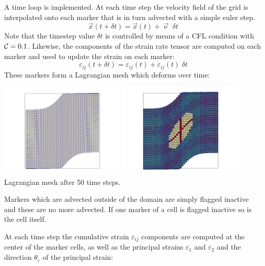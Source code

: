 A time loop is implemented. At each time step the velocity field of the grid is 
interpolated onto each marker that is in turn advected with a simple euler step. 
\[
\vec{x}(t+\delta t) = \vec{x}(t) + \vec\upnu \; \delta t
\]
Note that the timestep value $\delta t$ is controlled by means of a CFL condition 
with ${\cal C}=0.1$. Likewise, the components of the strain rate tensor are computed on each marker and 
used to update the strain on each marker:
\[
\varepsilon_{ij}(t+\delta t) = \varepsilon_{ij}(t) + \dot\varepsilon_{ij}(t) \; \delta t
\]
These markers form a Lagrangian mesh which deforms over time:
\begin{center}
\includegraphics[width=6cm]{python_codes/fieldstone_89/results/shearband/init/swarm_mesh}
\includegraphics[width=6cm]{python_codes/fieldstone_89/results/shearband/init/swarm_paint}\\
{\captionfont Lagrangian mesh after 50 time steps.}
\end{center}
Markers which are advected outside of the domain are simply flagged inactive and these
are no more advected. If one marker of a cell is flagged inactive so is the cell itself. 

At each time step the cumulative strain $\varepsilon_{ij}$ components are
computed at the center of the marker cells, as well as the principal strains $\varepsilon_1$ 
and $\varepsilon_2$ and the direction $\theta_\varepsilon$ of the principal strain:


